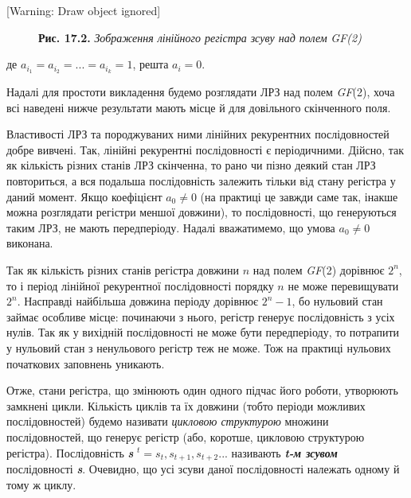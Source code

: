 \documentclass[a4paper]{article}
\newcounter{}
\begin{document}
\bigskip

[Warning: Draw object ignored]


\bigskip


\bigskip


\bigskip


\bigskip


\bigskip



\begin{figure}
\centering
\begin{minipage}{5.1425in}
\textbf{Рис. 17.2.}\textbf{\textit{ }}\textit{Зображення лінійного регістра
зсуву над полем}\textbf{\textit{ }}\textit{GF}\textit{(2)}
\end{minipage}
\end{figure}

\bigskip


\bigskip

де  ${a_{{i_{{1}}}}=a_{i_{{2}}}{=\text{.}\text{.}\text{.}=a_{i_{{k}}}}{=1}}$,
решта  ${a_{{i}}=0}$.

Надалі для простоти викладення будемо розглядати ЛРЗ над полем \textit{GF}(2),
хоча всі наведені нижче результати мають місце й для довільного скінченного
поля.

Властивості ЛРЗ та породжуваних ними лінійних рекурентних послідовностей добре
вивчені. Так, лінійні рекурентні послідовності є періодичними. Дійсно, так як
кількість різних станів ЛРЗ скінченна, то рано чи пізно деякий стан ЛРЗ
повториться, а вся подальша послідовність залежить тільки від  стану регістра у
даний момент. Якщо коефіцієнт  ${a_{{0}}\neq 0}$ (на практиці це завжди саме
так, інакше можна розглядати регістри меншої довжини), то послідовності, що
генеруються таким ЛРЗ, не мають передперіоду. Надалі вважатимемо, що умова 
${a_{{0}}\neq 0}$ виконана. 

Так як кількість різних станів регістра довжини  ${n}$ над полем \textit{GF}(2)
дорівнює  ${2^{{n}}}$, то і період лінійної рекурентної послідовності порядку 
${n}$ не може перевищувати  ${2^{{n}}}$. Насправді найбільша довжина періоду
дорівнює  ${2^{{n}}-1}$, бо нульовий стан займає особливе місце: починаючи з
нього, регістр генерує послідовність з усіх нулів. Так як у вихідній
послідовності не може бути передперіоду, то потрапити у нульовий стан з
ненульового регістр теж не може. Тож на практиці нульових початкових заповнень
уникають. 

Отже, стани регістра, що змінюють один одного підчас його роботи, утворюють
замкнені цикли. Кількість циклів та їх довжини (тобто періоди можливих
послідовностей) будемо називати \textit{цикловою структурою}\textbf{ }множини
послідовностей, що генерує регістр (або, коротше, цикловою структурою
регістра). Послідовність \textbf{\textit{s}}
${{}^{{t}}=s_{{t}},s_{{t+1}},s_{{t+2}}\text{.}\text{.}\text{.}}$ називають
\textbf{\textit{t}}\textbf{\textit{{}-м зсувом}} послідовності\textbf{
}\textbf{\textit{s}}. Очевидно, що усі зсуви даної послідовності належать
одному й тому ж циклу.
\end{document}
